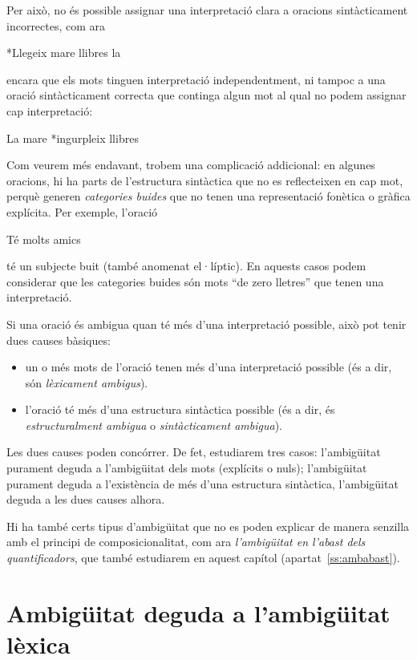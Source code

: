 Per això, no és possible assignar una interpretació clara a oracions
sin\-tàc\-ti\-ca\-ment incorrectes, com ara
\begin{exemple}
*Llegeix mare llibres la
\end{exemple} 
encara que els mots tinguen interpretació independentment, ni
tampoc a una oració sintàcticament correcta que continga algun mot al
qual no podem assignar cap interpretació:
\begin{exemple}
 La mare *ingurpleix llibres
\end{exemple}
Com veurem més endavant, trobem una complicació addicional: en algunes
oracions, hi ha parts de l'estructura sintàctica que no
es reflecteixen en cap mot, perquè generen \emph{categories buides} que
no tenen una representació fonètica o gràfica explícita.  Per exemple,
l'oració 
\begin{exemple}
Té molts amics
\end{exemple} té un subjecte buit (també anomenat
el·líptic). En aquests casos podem considerar que les categories
buides són mots ``de zero lletres'' que tenen una interpretació.

Si una oració és ambigua quan té més d'una interpretació possible, això
pot tenir dues causes bàsiques:
\begin{itemize}
\item un o més mots de l'oració tenen més d'una interpretació possible
  (és a dir, són \emph{lèxicament ambigus}).
\item l'oració té més d'una estructura sintàctica possible (és a dir,
  és \emph{estructuralment ambigua} o \emph{sintàcticament ambigua}).
\end{itemize}
Les dues causes poden concórrer. De fet, estudiarem tres casos:
l'ambigüitat purament deguda a l'ambigüitat dels mots (explícits o
nuls); l'ambigüitat purament deguda a l'existència de més d'una
estructura sintàctica, l'ambigüitat deguda a les dues causes alhora.


Hi ha també certs tipus d'ambigüitat que no es poden explicar de
manera senzilla amb el principi de composicionalitat, com ara {\em
  l'ambigüitat en l'abast dels quantificadors}, que també estudiarem
en aquest capítol (apartat~\ref{ss:ambabast}).


\section{Ambigüitat  deguda a l'ambigüitat lèxica}
\label{ss:amblex}



